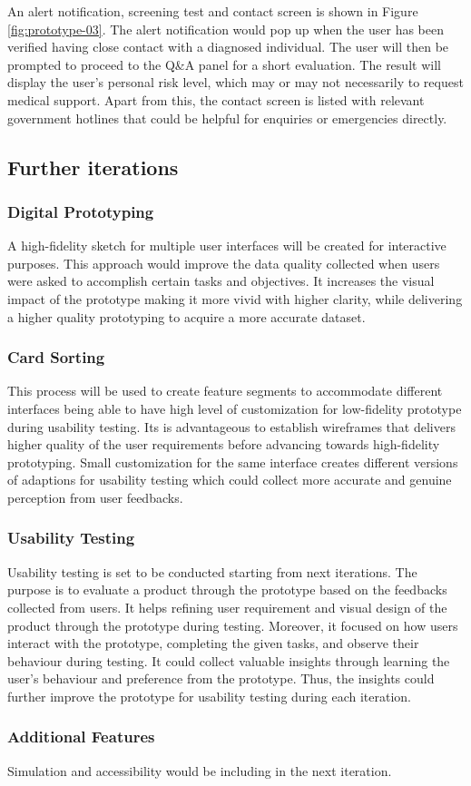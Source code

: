       \par An alert notification, screening test and contact screen is shown in Figure \ref{fig:prototype-03}. The alert notification would pop up when the user has been verified having close contact with a diagnosed individual. The user will then be prompted to proceed to the Q\&A panel for a short evaluation. The result will display the user’s personal risk level, which may or may not necessarily to request medical support. Apart from this, the contact screen is listed with relevant government hotlines that could be helpful for enquiries or emergencies directly.

    \subsection{Further iterations}
      \subsubsection{Digital Prototyping}
        \par A high-fidelity sketch for multiple user interfaces will be created for interactive purposes. This approach would improve the data quality collected when users were asked to accomplish certain tasks and objectives. It increases the visual impact of the prototype making it more vivid with higher clarity, while delivering a higher quality prototyping to acquire a more accurate dataset.

      \subsubsection{Card Sorting}
        \par This process will be used to create feature segments to accommodate different interfaces being able to have high level of customization for low-fidelity prototype during usability testing. Its is advantageous to establish wireframes that delivers higher quality of the user requirements before advancing towards high-fidelity prototyping. Small customization for the same interface creates different versions of adaptions for usability testing which could collect more accurate and genuine perception from user feedbacks.

      \subsubsection{Usability Testing}
        \par Usability testing is set to be conducted starting from next iterations. The purpose is to evaluate a product through the prototype based on the feedbacks collected from users. It helps refining user requirement and visual design of the product through the prototype during testing. Moreover, it focused on how users interact with the prototype, completing the given tasks, and observe their behaviour during testing. It could collect valuable insights through learning the user’s behaviour and preference from the prototype. Thus, the insights could further improve the prototype for usability testing during each iteration.

      \subsubsection{Additional Features}
        \par Simulation and accessibility would be including in the next iteration.